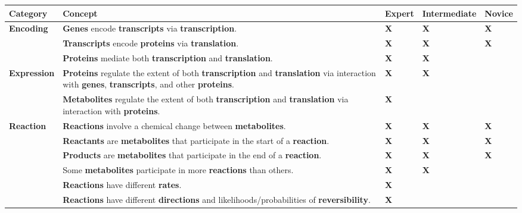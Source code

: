 
\begin{table}[htbp]
\small
\centering
\begin{tabular}{ |m{1.9cm}|m{11cm}|m{1cm}|m{1.3cm}|m{1cm}| }
\hline
\textbf{Category}
& \textbf{Concept}
& \textbf{Expert}
& \textbf{Inter\-mediate}
& \textbf{Novice}
\\
\hline
\multirow{3}{1.5cm}{\textbf{Encoding}}
& \textbf{Genes} encode \textbf{transcripts} via \textbf{transcription}.
& \textbf{X}
& \textbf{X}
& \textbf{X}
\\
\cline{2-5}
& \textbf{Transcripts} encode \textbf{proteins} via \textbf{translation}.
& \textbf{X}
& \textbf{X}
& \textbf{X}
\\
\cline{2-5}
& \textbf{Proteins} mediate both \textbf{transcription} and \textbf{translation}.
& \textbf{X}
& \textbf{X}
&
\\
\hline
\multirow{2}{1.5cm}{\textbf{Expression}}
& \textbf{Proteins} regulate the extent of both \textbf{transcription} and \textbf{translation} via interaction with \textbf{genes}, \textbf{transcripts}, and other \textbf{proteins}.
& \textbf{X}
& \textbf{X}
&
\\
\cline{2-5}
& \textbf{Metabolites} regulate the extent of both \textbf{transcription} and \textbf{translation} via interaction with \textbf{proteins}.
& \textbf{X}
&
&
\\
\hline
\multirow{8}{1.5cm}{\textbf{Reaction}}
& \textbf{Reactions} involve a chemical change between \textbf{metabolites}.
& \textbf{X}
& \textbf{X}
& \textbf{X}
\\
\cline{2-5}
& \textbf{Reactants} are \textbf{metabolites} that participate in the start of a \textbf{reaction}.
& \textbf{X}
& \textbf{X}
& \textbf{X}
\\
\cline{2-5}
& \textbf{Products} are \textbf{metabolites} that participate in the end of a \textbf{reaction}.
& \textbf{X}
& \textbf{X}
& \textbf{X}
\\
\cline{2-5}
& Some \textbf{metabolites} participate in more \textbf{reactions} than others.
& \textbf{X}
& \textbf{X}
&
\\
\cline{2-5}
& \textbf{Reactions} have different \textbf{rates}.
& \textbf{X}
&
&
\\
\cline{2-5}
& \textbf{Reactions} have different \textbf{directions} and likelihoods/probabilities of \textbf{reversibility}.
& \textbf{X}
&
&
\\

\end{tabular}
\end{table}
